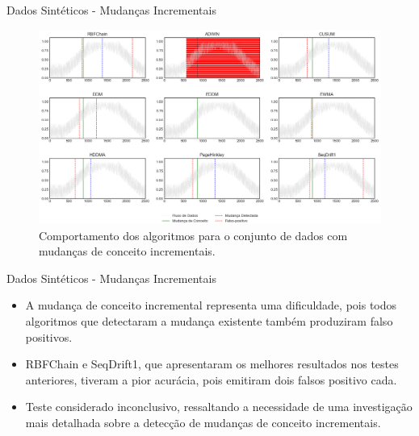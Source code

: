 \documentclass[10pt]{beamer}
\begin{document}
\begin{frame}{Dados Sintéticos -  Mudanças Incrementais}
    \begin{figure}[t]
        \begin{center}
            \includegraphics[width=\textwidth]{imagens/incremental.png}
            \caption{Comportamento dos algoritmos para o conjunto de dados com mudanças de conceito incrementais.}
            \label{fig:exp_incremental}
        \end{center}
    \end{figure}
\end{frame}

\begin{frame}{Dados Sintéticos -  Mudanças Incrementais}
    \begin{itemize}
        \item A mudança de conceito incremental representa uma dificuldade, pois todos algoritmos que detectaram a mudança existente também produziram falso positivos.
        \item RBFChain e SeqDrift1, que apresentaram os melhores resultados nos testes anteriores, tiveram a pior acurácia, pois emitiram dois falsos positivo cada.
        \item Teste considerado inconclusivo, ressaltando a necessidade de uma investigação mais detalhada sobre a detecção de mudanças de conceito incrementais.
    \end{itemize}
\end{frame}
\end{document}
